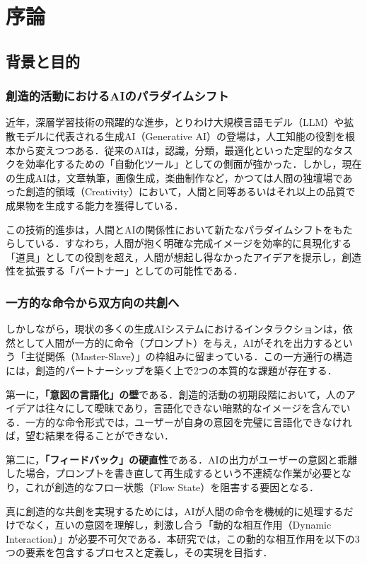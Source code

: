 \chapter{序論}
\label{chap:序論}

\section{背景と目的}
\label{sec:背景と目的}

\subsection{創造的活動におけるAIのパラダイムシフト}
近年，深層学習技術の飛躍的な進歩，とりわけ大規模言語モデル（LLM）や拡散モデルに代表される生成AI（Generative AI）の登場は，人工知能の役割を根本から変えつつある．従来のAIは，認識，分類，最適化といった定型的なタスクを効率化するための「自動化ツール」としての側面が強かった．しかし，現在の生成AIは，文章執筆，画像生成，楽曲制作など，かつては人間の独壇場であった創造的領域（Creativity）において，人間と同等あるいはそれ以上の品質で成果物を生成する能力を獲得している．

この技術的進歩は，人間とAIの関係性において新たなパラダイムシフトをもたらしている．すなわち，人間が抱く明確な完成イメージを効率的に具現化する「道具」としての役割を超え，人間が想起し得なかったアイデアを提示し，創造性を拡張する「パートナー」としての可能性である．

\subsection{一方的な命令から双方向の共創へ}
しかしながら，現状の多くの生成AIシステムにおけるインタラクションは，依然として人間が一方的に命令（プロンプト）を与え，AIがそれを出力するという「主従関係（Master-Slave）」の枠組みに留まっている．この一方通行の構造には，創造的パートナーシップを築く上で2つの本質的な課題が存在する．

第一に，\textbf{「意図の言語化」の壁}である．創造的活動の初期段階において，人のアイデアは往々にして曖昧であり，言語化できない暗黙的なイメージを含んでいる．一方的な命令形式では，ユーザーが自身の意図を完璧に言語化できなければ，望む結果を得ることができない．

第二に，\textbf{「フィードバック」の硬直性}である．AIの出力がユーザーの意図と乖離した場合，プロンプトを書き直して再生成するという不連続な作業が必要となり，これが創造的なフロー状態（Flow State）を阻害する要因となる．

真に創造的な共創を実現するためには，AIが人間の命令を機械的に処理するだけでなく，互いの意図を理解し，刺激し合う「動的な相互作用（Dynamic Interaction）」が必要不可欠である．本研究では，この動的な相互作用を以下の3つの要素を包含するプロセスと定義し，その実現を目指す．

